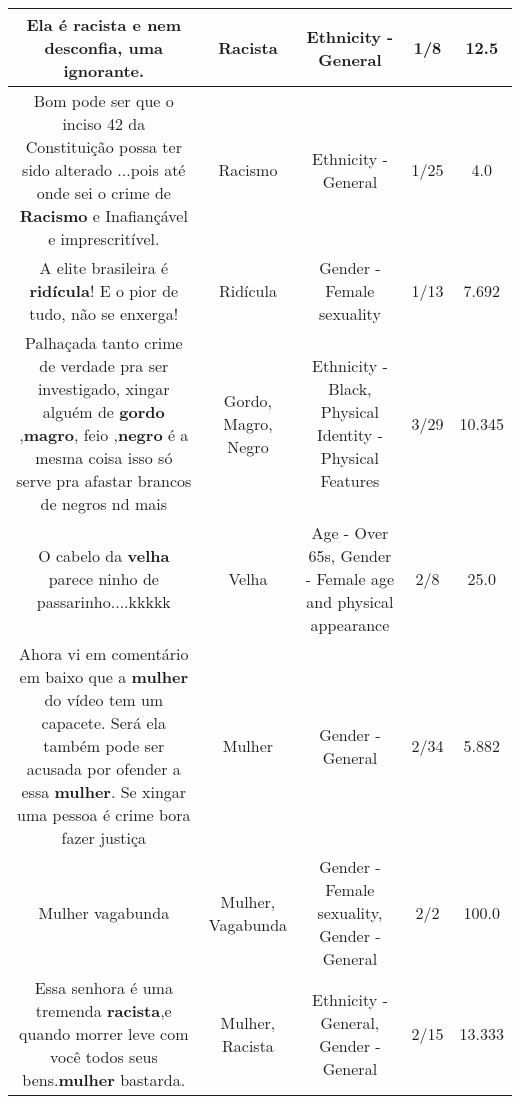 \documentclass[11pt]{article}
\newlength\mylength
\begin{document}
\begin{center}
\begin{longtable}{|C{.65\mylength}|C{.30\mylength}|C{.12\mylength}|C{.12\mylength}|C{.12\mylength}|}
  \small Ela é \textbf{racista} e nem desconfia, uma ignorante.\normalsize   & Racista & Ethnicity - General & 1/8 & 12.5 \\  \hline
  \small Bom pode ser que o inciso 42 da Constituição possa ter sido alterado ...pois até onde sei o crime de \textbf{Racismo} e Inafiançável e imprescritível.\normalsize   & Racismo & Ethnicity - General & 1/25 & 4.0 \\  \hline
  \small A elite brasileira é \textbf{ridícula}! E o pior de tudo, não se enxerga!\normalsize   & Ridícula & Gender - Female sexuality & 1/13 & 7.692 \\  \hline
  \small Palhaçada tanto crime de verdade pra ser investigado, xingar alguém de \textbf{gordo} ,\textbf{magro}, feio ,\textbf{negro} é a mesma coisa isso só serve pra afastar brancos de negros nd mais\normalsize   & Gordo, Magro, Negro & Ethnicity - Black, Physical Identity - Physical Features & 3/29 & 10.345 \\  \hline
  \small O cabelo da \textbf{v\textbf{elha}} parece  ninho de passarinho....kkkkk\normalsize   & Velha & Age - Over 65s, Gender - Female age and physical appearance & 2/8 & 25.0 \\  \hline
  \small Ahora vi em comentário em baixo que a \textbf{mulher} do vídeo tem um capacete. Será ela também pode ser acusada por ofender a essa \textbf{mulher}. Se xingar uma pessoa é crime bora fazer justiça\normalsize   & Mulher & Gender - General & 2/34 & 5.882 \\  \hline
  \small Mulher vagabunda\normalsize   & Mulher, Vagabunda & Gender - Female sexuality, Gender - General & 2/2 & 100.0 \\  \hline
  \small Essa senhora é uma tremenda \textbf{racista},e quando morrer leve com você todos seus bens.\textbf{mulher} bastarda.\normalsize   & Mulher, Racista & Ethnicity - General, Gender - General & 2/15 & 13.333 \\  \hline

\end{longtable}
\end{center}
\end{document}

